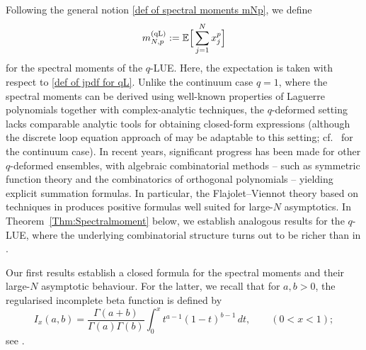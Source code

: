 \documentclass{amsart}
\theoremstyle{plain}
\theoremstyle{remark}
\numberwithin{equation}{section}
\begin{document}
Following the general notion \eqref{def of spectral moments mNp}, we define  
\begin{equation} \label{def of qLUE moments}
m_{N,p}^{ \rm (qL) } := \mathbb{E} \Big[ \sum_{j=1}^N x_j^p \Big]
\end{equation}
for the spectral moments of the $q$-LUE. Here, the expectation is taken with respect to \eqref{def of jpdf for qL}.
Unlike the continuum case $q=1$, where the spectral moments can be derived using well-known properties of Laguerre polynomials together with complex-analytic techniques, the $q$-deformed setting lacks comparable analytic tools for obtaining closed-form expressions (although the discrete loop equation approach of \cite{BGG17} may be adaptable to this setting; cf.~\cite{WF14} for the continuum case).
In recent years, significant progress has been made for other $q$-deformed 
ensembles, with algebraic combinatorial methods -- such as symmetric function theory \cite{BF25a,FLSY23,Fo21,MPS20} and the combinatorics of orthogonal polynomials \cite{BFO24,BJO25} -- yielding explicit summation formulas. In particular, the Flajolet--Viennot theory based on techniques in \cite{BFO24,BJO25} produces positive formulas well suited for large-$N$ asymptotics.  
In Theorem~\ref{Thm:Spectralmoment} below, we establish analogous results for the $q$-LUE, where the underlying combinatorial structure turns out to be richer than in \cite{BFO24,BJO25}.

Our first results establish a closed formula for the spectral moments and their large-$N$ asymptotic behaviour. For the latter, we recall that for $a,b>0$, the regularised incomplete beta function is defined by
\begin{equation} \label{def of beta ftn}
I_x(a,b)=  \frac{ \Gamma(a+b) }{ \Gamma(a)\Gamma(b) } \int_0^x t^{a-1} (1-t)^{b-1}\,dt, \qquad (0<x<1);
\end{equation}
see \cite[Section~8.17]{NIST}. 
 
\end{document}
